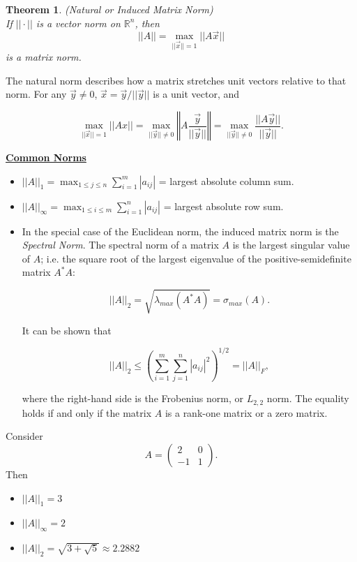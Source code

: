 \documentclass[12pt]{article}
\newcommand{\vecx}{\ensuremath{\vec{x}}}
\newcommand{\vecy}{\ensuremath{\vec{y}}}
\newtheorem{theorem}{Theorem}
\newenvironment{example}[1][Example]{\begin{trivlist}
\item[\hskip \labelsep {\bfseries #1}]}{\end{trivlist}}
\begin{document}
\begin{theorem} (Natural or Induced Matrix Norm)\\
If $||\cdot||$ is a vector norm on $\mathbb{R}^n$, then
\[
||A|| = \max_{||\vecx|| =1} ||A\vecx||
\]
is a matrix norm.
\end{theorem}

\vspace*{1em}

The natural norm describes how a matrix stretches unit vectors relative to 
that norm. For any $\vecy \ne 0$, $\vecx = \vecy/||\vecy||$ is a unit vector,
and

\[
\max_{||\vecx||=1}||Ax|| =
\max_{||\vecy||\ne 0}\left\Vert A\frac{\vecy}{||\vecy||}\right\Vert =
\max_{||\vecy||\ne 0}\frac{||A\vecy||}{||\vecy||}.
\] 

\vspace*{1em}
\underline{\textbf{Common Norms}}

\begin{itemize}
\item $||A||_1 = \displaystyle{\max_{1\leq j\leq n}}
      \displaystyle{\sum_{i=1}^m}|a_{ij}|$ = largest absolute column sum.
\item $||A||_\infty = \displaystyle{\max_{1\leq i\leq m}}
      \displaystyle{\sum_{i=1}^n}|a_{ij}|$ = largest absolute row sum. 
\item In the special case of the Euclidean norm, the induced matrix norm is 
      the \textit{Spectral Norm}.
The spectral norm of a matrix $A$ is the largest singular value of $A$; i.e. 
the square root of the largest eigenvalue of the positive-semidefinite matrix
$A^*A$:

\[
||A||_2 = \sqrt{\lambda_{max}(A^* A)} = \sigma_{max}(A).
\]

It can be shown that

\[
||A||_2 \leq \left(\sum_{i=1}^m\sum_{j=1}^n |a_{ij}|^2\right)^{1/2} = ||A||_F,
\]

where the right-hand side is the Frobenius norm, or $L_{2,2}$ norm. The 
equality holds if and only if the matrix $A$ is a rank-one matrix or a zero 
matrix.
\end{itemize}
\pagebreak

\begin{example}
Consider 
\[
A = \left(\begin{array}{cc}
2 & 0  \\ -1 & 1 
\end{array}
\right).
\]
Then
\begin{itemize}
\item[i.] $||A||_1 = 3$
\item[ii.] $||A||_\infty = 2$
\item[iii.] $||A||_2 = \sqrt{3+\sqrt{5}} \approx 2.2882$
\end{itemize}
\end{example}
\end{document}
